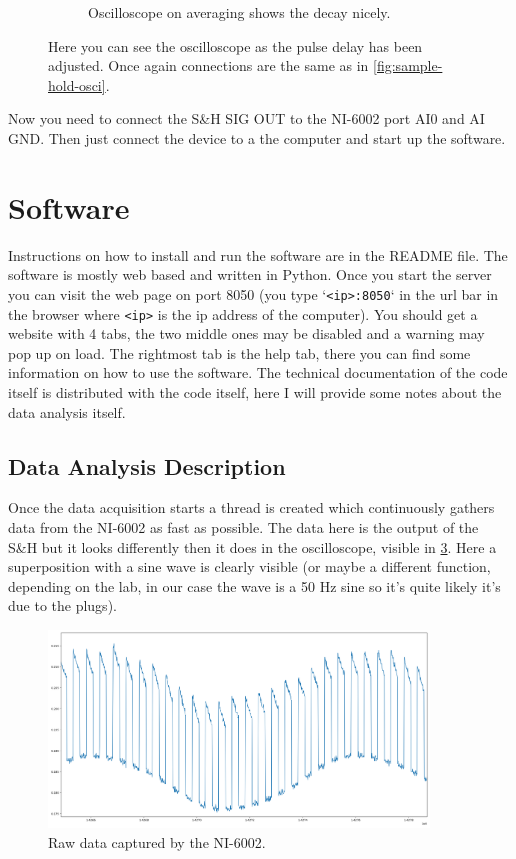 \documentclass[a4paper, 10pt]{article}
\begin{document}
\begin{figure}[H]
\begin{subfigure}{0.45\textwidth}
        \caption{Oscilloscope on averaging shows the decay nicely.}
        \label{fig:config-width-averaging}
    \end{subfigure}
    \caption{Here you can see the oscilloscope as the pulse delay has been adjusted. Once again connections are the same as in \cref{fig:sample-hold-osci}.}
    \label{fig:config-width}
\end{figure}

Now you need to connect the S\&H SIG OUT to the NI-6002 port AI0 and AI GND.
Then just connect the device to a the computer and start up the software.

\section{Software}
Instructions on how to install and run the software are in the README file.
The software is mostly web based and written in Python.
Once you start the server you can visit the web page on port 8050 (you type `\lstinline{<ip>:8050}` in the url bar in the browser where \lstinline{<ip>} is the ip address of the computer).
You should get a website with 4 tabs, the two middle ones may be disabled and a warning may pop up on load.
The rightmost tab is the help tab, there you can find some information on how to use the software.
The technical documentation of the code itself is distributed with the code itself, here I will provide some notes about the data analysis itself.

\subsection{Data Analysis Description}
Once the data acquisition starts a thread is created which continuously gathers data from the NI-6002 as fast as possible.
The data here is the output of the S\&H but it looks differently then it does in the oscilloscope, visible in \cref{fig:soft-raw-data}.
Here a superposition with a sine wave is clearly visible (or maybe a different function, depending on the lab, in our case the wave is a 50 \si{\hertz} sine so it's quite likely it's due to the plugs).

\begin{figure}[H]
    \centering
    \includegraphics[width=0.9\textwidth]{../images/soft-raw-data.png}
    \caption{Raw data captured by the NI-6002.}
    \label{fig:soft-raw-data}
\end{figure}
\end{document}
